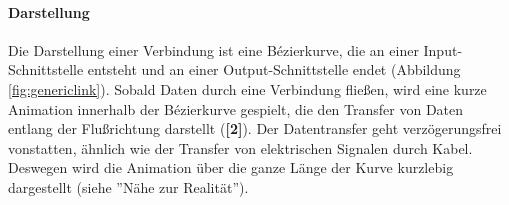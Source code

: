 \paragraph{Darstellung} Die Darstellung einer Verbindung ist eine Bézierkurve, die an einer Input-Schnittstelle entsteht und an einer Output-Schnittstelle endet (Abbildung \ref{fig:genericlink}). Sobald Daten durch eine Verbindung fließen, wird eine kurze Animation innerhalb der Bézierkurve gespielt, die den Transfer von Daten entlang der Flußrichtung darstellt (\textbf{[2]}). Der Datentransfer geht verzögerungsfrei vonstatten, ähnlich wie der Transfer von elektrischen Signalen durch Kabel. Deswegen wird die Animation über die ganze Länge der Kurve kurzlebig dargestellt (siehe ''Nähe zur Realität'').


